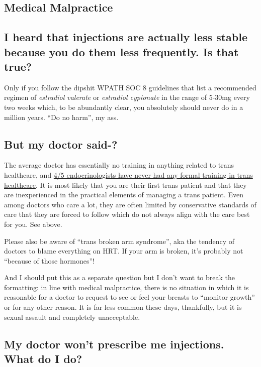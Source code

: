 \documentclass{article}
\begin{document}
\subsection*{Medical Malpractice}

\subsection{I heard that injections are actually less stable because you do them less frequently. Is that true?}

Only if you follow the dipshit WPATH SOC 8 guidelines that list a recommended regimen of \textit{estradiol valerate} or \textit{estradiol cypionate} in the range of 5-30mg every two weeks which, to be abundantly clear, you absolutely should never do in a million years. “Do no harm”, my ass.

\subsection{But my doctor said-?}

The average doctor has essentially no training in anything related to trans healthcare, and \href{https://www.endocrine.org/news-and-advocacy/news-room/2017/endocrinologists-want-training-in-transgender-care}{4/5 endocrinologists have never had any formal training in trans healthcare}. It is most likely that you are their first trans patient and that they are inexperienced in the practical elements of managing a trans patient. Even among doctors who care a lot, they are often limited by conservative standards of care that they are forced to follow which do not always align with the care best for you. See above.

Please also be aware of “trans broken arm syndrome”, aka the tendency of doctors to blame everything on HRT. If your arm is broken, it's probably not “because of those hormones”!

And I should put this as a separate question but I don't want to break the formatting: in line with medical malpractice, there is no situation in which it is reasonable for a doctor to request to see or feel your breasts to “monitor growth” or for any other reason. It is far less common these days, thankfully, but it is sexual assault and completely unacceptable.

\subsection{My doctor won’t prescribe me injections. What do I do?}
\end{document}
